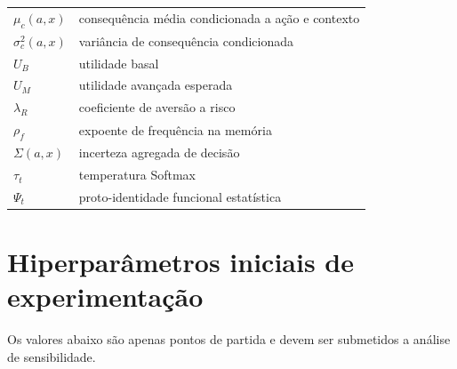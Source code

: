 \begin{longtable}{p{}p{}}
\(\mu_c(a,x)\) & consequência média condicionada a ação e contexto\\
\(\sigma_c^2(a,x)\) & variância de consequência condicionada\\
\(U_B\) & utilidade basal\\
\(U_M\) & utilidade avançada esperada\\
\(\lambda_R\) & coeficiente de aversão a risco\\
\(\rho_f\) & expoente de frequência na memória\\
\(\Sigma(a,x)\) & incerteza agregada de decisão\\
\(\tau_t\) & temperatura Softmax\\
\(\Psi_t\) & proto-identidade funcional estatística\\
\bottomrule
\end{longtable}

\section{Hiperparâmetros iniciais de experimentação}

Os valores abaixo são apenas pontos de partida e devem ser submetidos a análise de sensibilidade.

